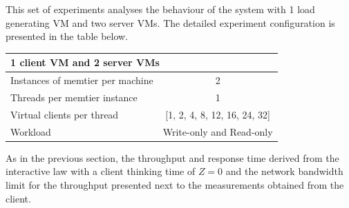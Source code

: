 \documentclass[report.tex]{subfiles}
\begin{document}
This set of experiments analyses the behaviour of the system with 1 load generating VM and two server VMs. The detailed experiment configuration is presented in the table below.

\begin{center}
	\scriptsize{
		\begin{tabular}{|l|c|}
			\multicolumn{2}{l}{1 client VM and 2 server VMs}\\
			\hline Instances of memtier per machine & 2                        \\ 
			\hline Threads per memtier instance     & 1                        \\
			\hline Virtual clients per thread       & [1, 2, 4, 8, 12, 16, 24, 32]\\ 
			\hline Workload                         & Write-only and Read-only \\
			\hline 
		\end{tabular}
	} 
\end{center}

As in the previous section, the throughput and response time derived from the interactive law with a client thinking time of $Z=0$ and the network bandwidth limit for the throughput presented next to the measurements obtained from the client.
\end{document}
